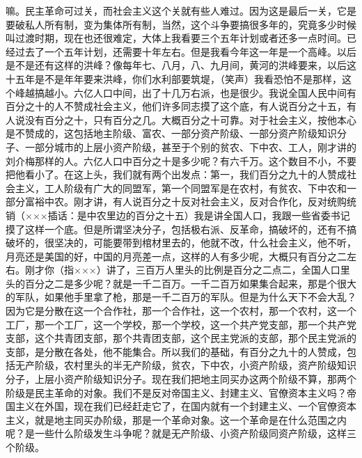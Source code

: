 嘛。民主革命可过关，而社会主义这个关就有些人难过。因为这是最后一关，它是要破私人所有制，变为集体所有制，当然，这个斗争要搞很多年的，究竟多少时候叫过渡时期，现在也还很难定，大体上我看要三个五年计划或者还多一点时间。已经过去了一个五年计划，还需要十年左右。但是我看今年这一年是一个高峰。以后是不是还有这样的洪峰？像每年七、八月，八、九月间，黄河的洪峰要来，以后这十五年是不是年年要来洪峰，你们水利部要筑堤，（笑声）我看恐怕不是那样，这个峰越搞越小。六亿人口中间，出了十几万右派，也是很少。我说全国人民中间有百分之十的人不赞成社会主义，他们许多同志摸了这个底，有人说百分之十五，有人说没有百分之十，只有百分之几。大概百分之十可靠。对于社会主义，按他本心是不赞成的，这包括地主阶级、富农、一部分资产阶级、一部分资产阶级知识分子、一部分城市的上层小资产阶级，甚至于个别的贫农、下中农、工人，刚才讲的刘介梅那样的人。六亿人口中百分之十是多少呢？有六千万。这个数目不小，不要把他看小了。在这上头，我们就有两个出发点：第一，我们百分之九十的人赞成社会主义，工人阶级有广大的同盟军，第一个同盟军是在农村，有贫农、下中农和一部分富裕中农。刚才讲，有人说百分之十反对社会主义，反对合作化，反对统购统销（×××插话：是中农里边的百分之十五）我是讲全国人口，我跟一些省委书记摸了这样一个底。但是所谓坚决分子，包括极右派、反革命，搞破坏的，还有不搞破坏的，很坚决的，可能要带到棺材里去的，他就不改，什么社会主义，他不听，月亮还是美国的好，中国的月亮差一点，这样的人有多少呢，大概只有百分之二左右。刚才你（指×××）讲了，三百万人里头的比例是百分之二点二，全国人口里头的百分之二是多少呢？就是一千二百万。一千二百万如果集合起来，那是个很大的军队，如果他手里拿了枪，那是一千二百万的军队。但是为什么天下不会大乱？因为它是分散在这一个合作社，那一个合作社，这一个农村，那一个农村，这一个工厂，那一个工厂，这一个学校，那一个学校，这一个共产党支部，那一个共产党支部，这个共青团支部，那个共青团支部，这个民主党派的支部，那个民主党派的支部，是分散在各处，他不能集合。所以我们的基础，有百分之九十的人赞成，包括无产阶级，农村里头的半无产阶级，贫农，下中农，小资产阶级，资产阶级知识分子，上层小资产阶级知识分子。现在我们把地主同买办这两个阶级不算，那两个阶级是民主革命的对象。我们不是反对帝国主义、封建主义、官僚资本主义吗？帝国主义在外国，现在我们已经赶走它了，在国内就有一个封建主义、一个官僚资本主义，就是地主同买办阶级，那是一个革命对象。这一个革命是在什么范围之内呢？是一些什么阶级发生斗争呢？就是无产阶级、小资产阶级同资产阶级，这样三个阶级。

